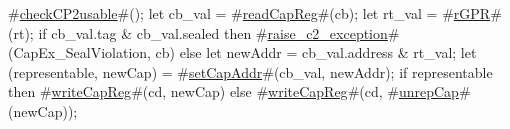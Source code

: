 #\hyperref[sailMIPSzcheckCP2usable]{checkCP2usable}#();
let cb_val = #\hyperref[sailMIPSzreadCapReg]{readCapReg}#(cb);
let rt_val = #\hyperref[sailMIPSzrGPR]{rGPR}#(rt);
if cb_val.tag & cb_val.sealed then
  #\hyperref[sailMIPSzraisezyc2zyexception]{raise\_c2\_exception}#(CapEx_SealViolation, cb)
else
{
  let newAddr = cb_val.address & rt_val;
  let (representable, newCap) = #\hyperref[sailMIPSzsetCapAddr]{setCapAddr}#(cb_val, newAddr);
  if representable then
      #\hyperref[sailMIPSzwriteCapReg]{writeCapReg}#(cd, newCap)
  else
      #\hyperref[sailMIPSzwriteCapReg]{writeCapReg}#(cd, #\hyperref[sailMIPSzunrepCap]{unrepCap}#(newCap));
}
